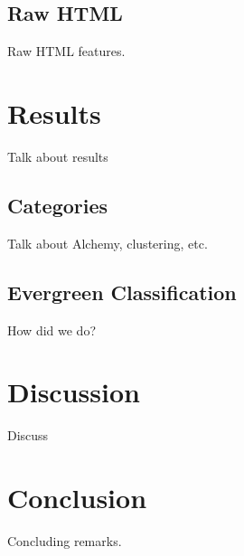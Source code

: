\documentclass[11pt]{article}
\begin{document}
\subsection{Raw HTML}
\label{ssect:rawhtml}
Raw HTML features.


\section{Results}
\label{sect:results}
Talk about results


\subsection{Categories}
\label{sect:categories}
Talk about Alchemy, clustering, etc.


\subsection{Evergreen Classification}
\label{sect:evergreenclassification}
How did we do?


\section{Discussion}
\label{sect:discussion}
Discuss

\section{Conclusion}
\label{sect:conclusion}
Concluding remarks.

\nocite{*}


{}

%
%
\end{document}
